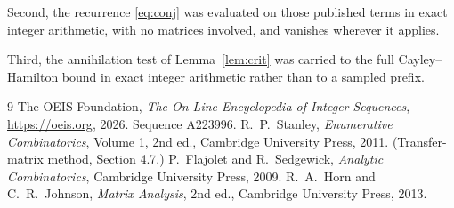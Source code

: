 \documentclass[11pt,a4paper]{article}
\theoremstyle{plain}
\theoremstyle{definition}
\begin{document}
Second, the recurrence \eqref{eq:conj} was evaluated on those published terms in exact
integer arithmetic, with no matrices involved, and vanishes wherever it applies.

Third, the annihilation test of Lemma~\ref{lem:crit} was carried to the full
Cayley--Hamilton bound in exact integer arithmetic rather than to a sampled prefix.

\begin{thebibliography}{9}
 The OEIS Foundation, \emph{The On-Line Encyclopedia of Integer
Sequences}, \url{https://oeis.org}, 2026. Sequence A223996.
 R.~P.~Stanley, \emph{Enumerative Combinatorics}, Volume 1, 2nd ed.,
Cambridge University Press, 2011. (Transfer-matrix method, Section 4.7.)
 P.~Flajolet and R.~Sedgewick, \emph{Analytic Combinatorics}, Cambridge
University Press, 2009.
 R.~A.~Horn and C.~R.~Johnson, \emph{Matrix Analysis}, 2nd ed., Cambridge
University Press, 2013.
\end{thebibliography}
\end{document}
